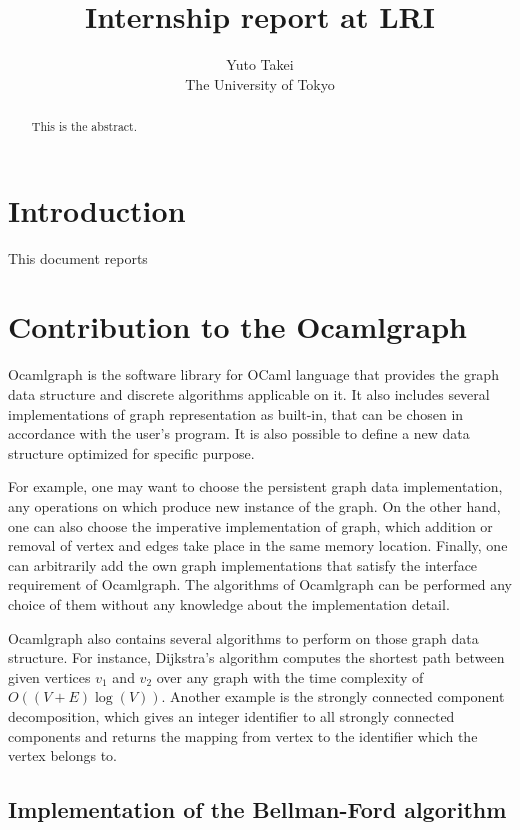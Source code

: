 \documentclass[a4paper,12pt]{article}
\title{Internship report at LRI}
\author{Yuto Takei \\ The University of Tokyo }
\begin{document}
\maketitle

\begin{abstract}
  This is the abstract.
\end{abstract}

\section{Introduction}

This document reports 

\section{Contribution to the Ocamlgraph}

Ocamlgraph \cite{conchon07tfp} is the software library for OCaml
language that provides the graph data structure and discrete
algorithms applicable on it. It also includes several implementations
of graph representation as built-in, that can be chosen in accordance
with the user's program. It is also possible to define a new data
structure optimized for specific purpose.

For example, one may want to choose the persistent graph data
implementation, any operations on which produce new instance of the
graph. On the other hand, one can also choose the imperative
implementation of graph, which addition or removal of vertex and edges
take place in the same memory location. Finally, one can arbitrarily
add the own graph implementations that satisfy the interface
requirement of Ocamlgraph. The algorithms of Ocamlgraph can be
performed any choice of them without any knowledge about the
implementation detail.

Ocamlgraph also contains several algorithms to perform on those graph
data structure. For instance, Dijkstra's algorithm computes the
shortest path between given vertices $v_1$ and $v_2$ over any graph
with the time complexity of $O((V+E)\log(V))$. Another example is the
strongly connected component decomposition, which gives an integer
identifier to all strongly connected components and returns the
mapping from vertex to the identifier which the vertex belongs to.

\subsection {Implementation of the Bellman-Ford algorithm}
\end{document}
